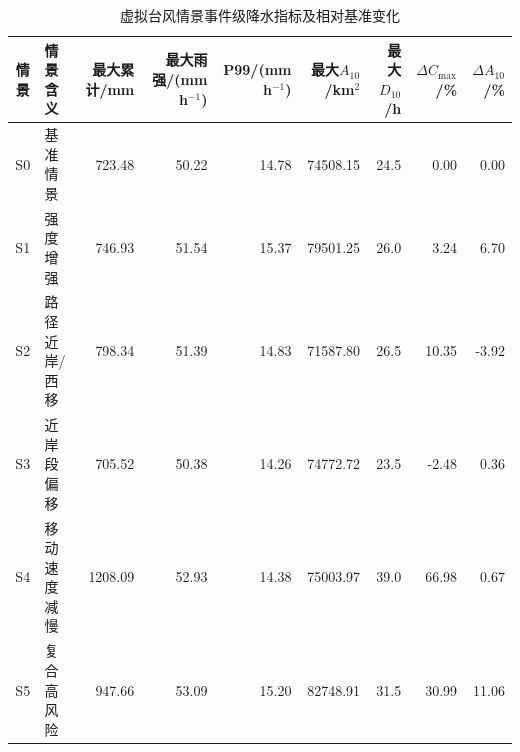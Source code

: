 \begin{table}[htbp]
\centering
\caption{虚拟台风情景事件级降水指标及相对基准变化}
\label{tab:problem3_scenario_comparison}
\begin{tabular}{c l r r r r r r r}
\hline
情景 & 情景含义 & 最大累计/mm & 最大雨强/(mm h$^{-1}$) & P99/(mm h$^{-1}$) & 最大$A_{10}$/km$^2$ & 最大$D_{10}$/h & $\Delta C_{\max}$/\% & $\Delta A_{10}$/\% \\
\hline
S0 & 基准情景 & 723.48 & 50.22 & 14.78 & 74508.15 & 24.5 & 0.00 & 0.00 \\
S1 & 强度增强 & 746.93 & 51.54 & 15.37 & 79501.25 & 26.0 & 3.24 & 6.70 \\
S2 & 路径近岸/西移 & 798.34 & 51.39 & 14.83 & 71587.80 & 26.5 & 10.35 & -3.92 \\
S3 & 近岸段偏移 & 705.52 & 50.38 & 14.26 & 74772.72 & 23.5 & -2.48 & 0.36 \\
S4 & 移动速度减慢 & 1208.09 & 52.93 & 14.38 & 75003.97 & 39.0 & 66.98 & 0.67 \\
S5 & 复合高风险 & 947.66 & 53.09 & 15.20 & 82748.91 & 31.5 & 30.99 & 11.06 \\
\hline
\end{tabular}
\end{table}

